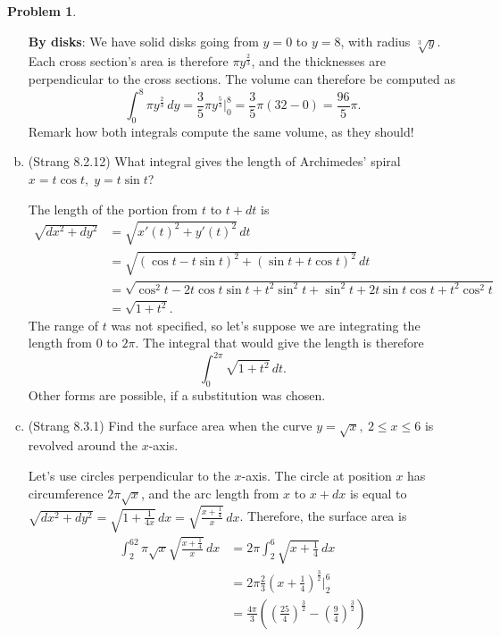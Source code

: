 \documentclass[11pt,oneside]{amsart}
\theoremstyle{definition}
\newtheorem{problem}{Problem}
\begin{document}
\begin{problem}
\begin{enumerate}[(a)]
\begin{solution}
                \textbf{By disks}: We have solid disks going from $y=0$ to $y=8$, with radius $\sqrt[3]y$. Each cross section's area is therefore $\pi y^{\frac 23}$, and the thicknesses are perpendicular to the cross sections. The volume can therefore be computed as
                \[\int_0^8 \pi y^{\frac23}\,dy=\frac 35\pi y^{\frac 53}\Big|_0^8=\frac 35\pi (32-0)=\frac{96}5\pi.\]
                Remark how both integrals compute the same volume, as they should!
            \end{solution}
            \item (Strang 8.2.12) What integral gives the length of Archimedes' spiral $x=t\cos t,\; y=t\sin t$?
            \begin{solution}
                The length of the portion from $t$ to $t+dt$ is
                \[\begin{split}
                    \sqrt{dx^2+dy^2} &=\sqrt{x'(t)^2+y'(t)^2}\,dt \\
                    &=\sqrt{(\cos t-t\sin t)^2+(\sin t+t\cos t)^2}\,dt\\
                    &= \sqrt{\cos^2 t-2t\cos t\sin t+t^2\sin^2 t+\sin^2 t+2t\sin t\cos t+t^2\cos^2 t}\\
                    &= \sqrt{1+t^2}.
                \end{split}\]
                The range of $t$ was not specified, so let's suppose we are integrating the length from 0 to $2\pi$. The integral that would give the length is therefore
                \[\int_0^{2\pi}\sqrt{1+t^2}\,dt.\]
                Other forms are possible, if a substitution was chosen.
            \end{solution}
            \item (Strang 8.3.1) Find the surface area when the curve $y=\sqrt x,\ 2\leq x\leq 6$ is revolved around the $x$-axis.
            \begin{solution}
                Let's use circles perpendicular to the $x$-axis. The circle at position $x$ has circumference $2\pi\sqrt x$, and the arc length from $x$ to $x+dx$ is equal to $\sqrt{dx^2+dy^2}=\sqrt{1+\frac 1{4x}}\,dx=\sqrt{\frac{x+\frac14}{x}}\,dx$. Therefore, the surface area is
                \[\begin{split}
                    \int_2^62\pi\sqrt x\sqrt{\frac{x+\frac14}{x}}\,dx &= 2\pi\int_2^6\sqrt{x+\frac 14}\,dx\\
                    &= 2\pi\frac 23\left(x+\frac 14\right)^{\frac32}\Big|_2^6\\
                    &= \frac {4\pi}3\left(\left(\frac{25}4\right)^{\frac32}-\left(\frac 94\right)^{\frac 32}\right)\\

\end{split}\]
\end{solution}
\end{enumerate}
\end{problem}
\end{document}
